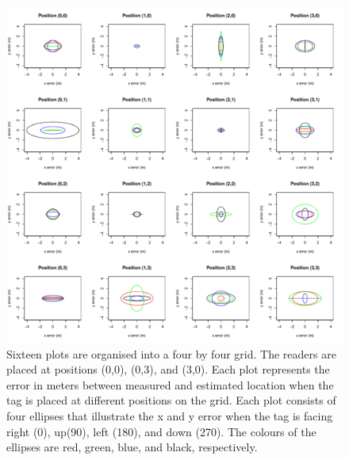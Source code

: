 \begin{figure}[H]
	\begin{center}
		\includegraphics[width=1\textwidth]{figures/error_distance_grid}
		\caption{Sixteen plots are organised into a four by four grid. The readers are placed at positions (0,0), (0,3), and (3,0). Each plot represents the error in meters between measured and estimated location when the tag is placed at different positions on the grid. Each plot consists of four ellipses that illustrate the x and y error when the tag is facing right (0\textdegree), up(90\textdegree), left (180\textdegree), and down (270\textdegree). The colours of the ellipses are red, green, blue, and black, respectively.}
	\end{center}
\end{figure}

